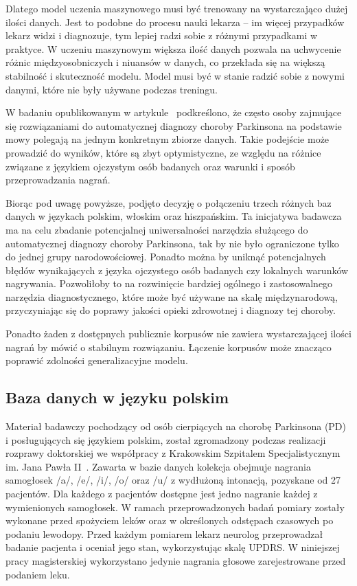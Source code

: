 Dlatego model uczenia maszynowego musi być trenowany na wystarczająco dużej ilości danych.
Jest to podobne do procesu nauki lekarza – im więcej przypadków lekarz widzi i diagnozuje, tym lepiej radzi sobie z różnymi przypadkami w praktyce.
W  uczeniu maszynowym większa ilość danych pozwala na uchwycenie różnic międzyosobniczych i niuansów w danych, co przekłada się na większą stabilność i skuteczność modelu.
Model musi być w stanie radzić sobie z nowymi danymi, które nie były używane podczas treningu.

W badaniu opublikowanym w artykule~\cite{SustainedVowelsProblems} podkreślono, że często osoby zajmujące się rozwiązaniami do automatycznej diagnozy choroby Parkinsona na podstawie mowy polegają na jednym konkretnym zbiorze danych.
Takie podejście może prowadzić do wyników, które są zbyt optymistyczne, ze względu na różnice związane z językiem ojczystym osób badanych oraz warunki i sposób przeprowadzania nagrań.

Biorąc pod uwagę powyższe, podjęto decyzję o połączeniu trzech różnych baz danych w językach polskim, włoskim oraz hiszpańskim.
Ta inicjatywa badawcza ma na celu zbadanie potencjalnej uniwersalności narzędzia służącego do automatycznej diagnozy choroby Parkinsona, tak by nie było ograniczone tylko do jednej grupy narodowościowej.
Ponadto można by uniknąć potencjalnych błędów wynikających z języka ojczystego osób badanych czy lokalnych warunków nagrywania.
Pozwoliłoby to na rozwinięcie bardziej ogólnego i zastosowalnego narzędzia diagnostycznego, które może być używane na skalę międzynarodową, przyczyniając się do poprawy jakości opieki zdrowotnej i diagnozy tej choroby.

Ponadto żaden z dostępnych publicznie korpusów nie zawiera wystarczającej ilości nagrań by mówić o stabilnym rozwiązaniu.
Łączenie korpusów może znacząco poprawić zdolności generalizacyjne modelu.

\subsection{Baza danych w języku polskim}
\label{subsec:polska-baza}

Materiał badawczy pochodzący od osób cierpiących na chorobę Parkinsona (PD) i posługujących się językiem polskim, został zgromadzony podczas
realizacji rozprawy doktorskiej we współpracy z Krakowskim Szpitalem Specjalistycznym im.
Jana Pawła II~\cite{daria:2018}.
Zawarta w bazie danych kolekcja obejmuje nagrania samogłosek /a/, /e/, /i/, /o/ oraz /u/ z wydłużoną intonacją, pozyskane od 27 pacjentów.
Dla każdego z pacjentów dostępne jest jedno nagranie każdej z wymienionych samogłosek.
W ramach przeprowadzonych badań pomiary zostały wykonane przed spożyciem leków oraz w określonych odstępach czasowych po podaniu lewodopy.
Przed każdym pomiarem lekarz neurolog przeprowadzał badanie pacjenta i oceniał jego stan, wykorzystując skalę UPDRS\@.
W niniejszej pracy magisterskiej wykorzystano jedynie nagrania głosowe zarejestrowane przed podaniem leku.

